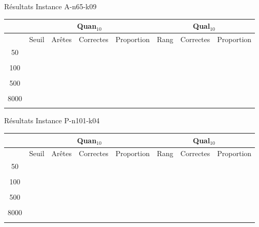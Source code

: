 \documentclass{beamer}
\begin{document}
\begin{frame}{Résultats}
Instance A-n65-k09
\begin{table}[H]


\begin{tabular}{|c|c|c|c|c|c|c|c|}
\hline
 & \multicolumn{4}{c|}{Quan$_{10}$} & \multicolumn{3}{c|}{Qual$_{10}$} \\
 \hline
 & Seuil & Arêtes & Correctes & Proportion & Rang & Correctes & Proportion \\
 \hline
 50 & & & & & & & \\
 \cline{2-8} 
    & & & & & & & \\
  \hline
   100 & & & & & & & \\
 \cline{2-8} 
    & & & & & & & \\
  \hline
   500 & & & & & & & \\
 \cline{2-8} 
    & & & & & & & \\
  \hline
   8000 & & & & & & & \\
 \cline{2-8} 
    & & & & & & & \\
  \hline

\end{tabular}
\end{table}
\end{frame}

\begin{frame}{Résultats}
Instance P-n101-k04
\begin{table}[H]


\begin{tabular}{|c|c|c|c|c|c|c|c|}
\hline
 & \multicolumn{4}{c|}{Quan$_{10}$} & \multicolumn{3}{c|}{Qual$_{10}$} \\
 \hline
 & Seuil & Arêtes & Correctes & Proportion & Rang & Correctes & Proportion \\
 \hline
 50 & & & & & & & \\
 \cline{2-8} 
    & & & & & & & \\
  \hline
   100 & & & & & & & \\
 \cline{2-8} 
    & & & & & & & \\
  \hline
   500 & & & & & & & \\
 \cline{2-8} 
    & & & & & & & \\
  \hline
   8000 & & & & & & & \\
 \cline{2-8} 
    & & & & & & & \\
  \hline

\end{tabular}
\end{table}
\end{frame}
\end{document}
